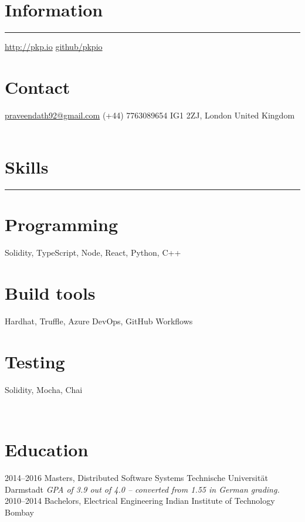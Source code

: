 \documentclass[]{friggeri-cv}
\begin{document}

\begin{aside}
    \section{Information}
        \noindent\rule{3cm}{0.5pt}
        \href{http://pkp.io}{http://pkp.io}
        \href{https://github.com/pkpio}{github/pkpio}
    \section{Contact}
        \href{mailto:praveendath92@gmail.com}{praveendath92@gmail.com}
        (+44) 7763089654
        IG1 2ZJ, London
        United Kingdom
    ~
    \section{Skills}
        \noindent\rule{3cm}{0.5pt}
    \section{Programming}
        Solidity, TypeScript, Node, React, Python, C++
    \section{Build tools}
        Hardhat, Truffle, Azure DevOps, GitHub Workflows
    \section{Testing}
        Solidity, Mocha, Chai
\end{aside}
~
\section{Education}
    \begin{entrylist}
        \entry
            {2014–2016}
            {Masters, {\normalfont Distributed Software Systems}}
            {Technische Universität Darmstadt}
            {\emph{GPA of 3.9 out of 4.0 -- converted from 1.55 in German grading.}}
        \entry
            {2010–2014}
            {Bachelors, {\normalfont Electrical Engineering}}
            {Indian Institute of Technology Bombay}
            {}%
    \end{entrylist}
    \vspace{-0.3cm}
\end{document}

